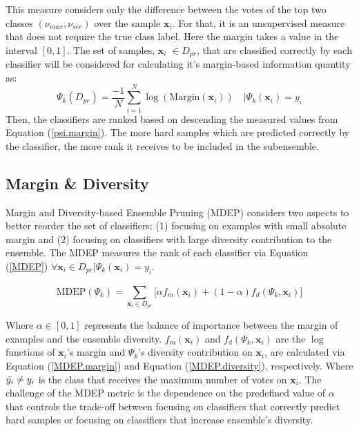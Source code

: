 This measure considers only the difference between the votes of the top two classes $(\nu_{max},\nu_{sec})$ over the sample $\textbf{x}_i$. For that, it is an unsupervised measure that does not require the true class label. Here the margin takes a value in the interval $[0,1]$. The set of samples, $\textbf{x}_i$ $\in D_{pr}$, that are classified correctly by each classifier will be considered for calculating it's margin-based information quantity as:
\begin{equation}
\label{psi.margin}
\Psi_k(D_{pr})=\frac{-1}{N}{\mathop{\sum}\limits_{i=1}^N    \log{}(\text{Margin}(\textbf{x}_i)) \quad \Big|  \Psi_k(\textbf{x}_i)=y_i } 
\end{equation}
Then, the classifiers are ranked based on descending the measured values from Equation (\ref{psi.margin}). The more hard samples which are predicted correctly by the classifier, the more rank it receives to be included in the subensemble.

\subsection{Margin \& Diversity} \label{ch5_MDEP}
Margin and Diversity-based Ensemble Pruning (MDEP) \cite{guo2018} considers two aspects to better reorder the set of classifiers: (1) focusing on examples with small absolute margin and (2) focusing on classifiers with large diversity contribution to the ensemble. The MDEP measures the rank of each classifier via Equation (\ref{MDEP}) $\forall \textbf{x}_i \in D_{pr}\big| \Psi_{k}(\textbf{x}_i)=y_i$. 

 \begin{equation}
\label{MDEP}
\text{MDEP}(\Psi_{k})= \sum_{\textbf{x}_i \in D_{pr}}^{}\Bigg[\alpha f_m(\textbf{x}_i)+ (1-\alpha) f_d(\Psi_{k},\textbf{x}_i)
\Bigg]  
\end{equation}


Where $\alpha \in [0,1]$ represents the balance of importance between the margin of examples and the ensemble diversity. $f_m(\textbf{x}_i)$ and $f_d(\Psi_{k},\textbf{x}_i)$ are the $\log{}$ functions of $\textbf{x}_i$'s margin and $\Psi_{k}$'s diversity contribution on $\textbf{x}_i$, are calculated via Equation (\ref{MDEP.margin}) and Equation (\ref{MDEP.diversity}), respectively. Where $\Bar{y_i} \neq y_i$ is the class that receives the maximum number of votes on $\textbf{x}_i$. The challenge of the MDEP metric is the dependence on the predefined value of $\alpha$ that controls the trade-off between focusing on classifiers that correctly predict hard samples or focusing on classifiers that increase ensemble's diversity.    




